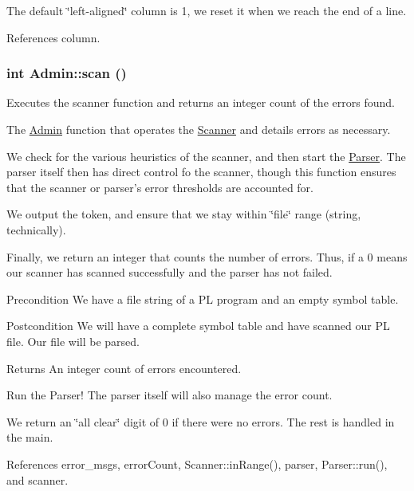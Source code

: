 The default \char`\"{}left-\/aligned\char`\"{} column is 1, we reset it when we reach the end of a line. 



References column.

\hypertarget{classAdmin_aaa4f711e8151dceab8d90c5f127c6820}{
\subsubsection[{scan}]{\setlength{\rightskip}{0pt plus 5cm}int Admin::scan ()}}
\label{classAdmin_aaa4f711e8151dceab8d90c5f127c6820}


Executes the scanner function and returns an integer count of the errors found. 

The \hyperlink{classAdmin}{Admin} function that operates the \hyperlink{classScanner}{Scanner} and details errors as necessary.

We check for the various heuristics of the scanner, and then start the \hyperlink{classParser}{Parser}. The parser itself then has direct control fo the scanner, though this function ensures that the scanner or parser's error thresholds are accounted for.

We output the token, and ensure that we stay within \char`\"{}file\char`\"{} range (string, technically).

Finally, we return an integer that counts the number of errors. Thus, if a 0 means our scanner has scanned successfully and the parser has not failed.

\begin{DoxyPrecond}{Precondition}
We have a file string of a PL program and an empty symbol table. 
\end{DoxyPrecond}
\begin{DoxyPostcond}{Postcondition}
We will have a complete symbol table and have scanned our PL file. Our file will be parsed. 
\end{DoxyPostcond}
\begin{DoxyReturn}{Returns}
An integer count of errors encountered. 
\end{DoxyReturn}


Run the Parser! The parser itself will also manage the error count.

We return an \char`\"{}all clear\char`\"{} digit of 0 if there were no errors. The rest is handled in the main. 



References error\_\-msgs, errorCount, Scanner::inRange(), parser, Parser::run(), and scanner.



